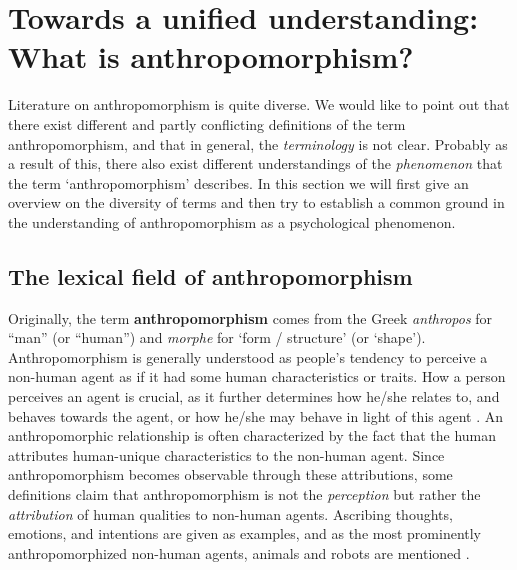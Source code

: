 \documentclass{frontiersSCNS} %
\begin{document}
%
%
%
%
%
%

\section{Towards a unified understanding: What is anthropomorphism?}
\label{sec:definitions}

Literature on anthropomorphism is quite diverse. We would like to point out that there exist different and partly conflicting definitions of the term anthropomorphism, and that in general, the \textit{terminology} is not clear. Probably as a result of this, there also exist different understandings of the \textit{phenomenon} that the term `anthropomorphism' describes.
 In this section we will first give an overview on the diversity of terms and
 then try to establish a common ground in the understanding of anthropomorphism
 as a psychological phenomenon.


 \subsection{The lexical field of anthropomorphism}

Originally, the term \textbf{anthropomorphism} comes from the Greek
\textit{anthropos} for ``man'' (or ``human'') and \textit{morphe} for `form /
structure' (or `shape'). Anthropomorphism is generally understood as people's
tendency to perceive a non-human agent as if it had some human characteristics
or traits. How a person perceives an agent is crucial, as it further determines
how he/she relates to, and behaves towards the agent, or how he/she may behave in
light of this agent \citep{epley_when_2008}. An anthropomorphic relationship is
often characterized by the fact that the human attributes human-unique
characteristics to the non-human agent. Since anthropomorphism becomes
observable through these attributions, some definitions claim that
anthropomorphism is not the \textit{perception} but rather the
\textit{attribution} of human qualities to non-human agents.  Ascribing
thoughts, emotions, and intentions are given as examples, and as the most
prominently anthropomorphized non-human agents, animals and robots are mentioned
\citep{duffy_anthropomorphism_2003,schmitz_concepts_2011}.
\end{document}
